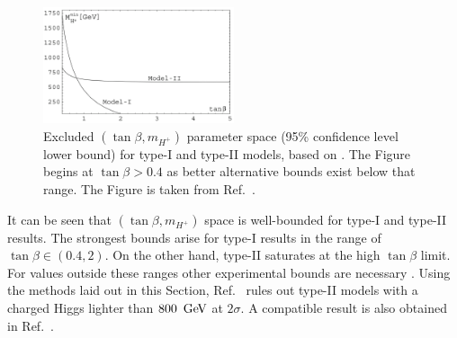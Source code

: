 \begin{figure}[hbtp!]
    \centering
        \includegraphics[width=0.5\textwidth]{figures/theory/xsgamma_2hdm_both_types.png}
    \caption{\label{fig:2hdm_limits} 
    Excluded $(\tan\beta,m_{H^+})$ parameter space (95\% confidence level lower bound) for type-I and type-II \TwoHDM models,
    based on .
    The Figure begins at $\tan\beta>0.4$ as better alternative bounds exist below that range.
    The Figure is taken from Ref.~\cite{Misiak:2017bgg}.}
\end{figure}

It can be seen that $(\tan\beta,m_{H^+})$ space is well-bounded for type-I and type-II \TwoHDM results.
The strongest bounds arise for type-I \TwoHDM results in the range of $\tan\beta\in(0.4,2)$.
On the other hand, type-II \TwoHDM saturates at the high $\tan\beta$ limit.
For values outside these ranges other experimental bounds are necessary \cite{Misiak:2017bgg}.
Using the methods laid out in this Section, Ref.~\cite{Misiak:2020vlo} rules out type-II \TwoHDM models with a charged Higgs lighter than $800~\mathrm{\,Ge\kern -0.1em V}$ at $2\sigma$.
A compatible result is also obtained in Ref.~\cite{Atkinson:2021eox}.